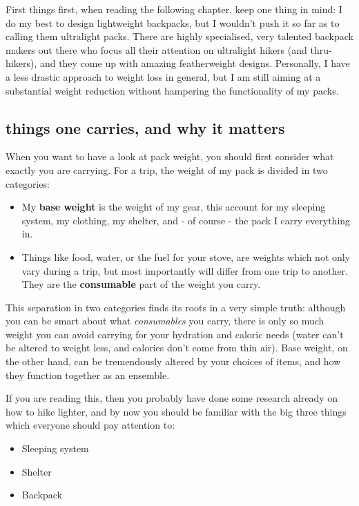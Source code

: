 First things first, when reading the following chapter, keep one thing in mind: I do my best to design lightweight backpacks, but I wouldn't push it so far as to calling them ultralight packs. There are highly specialised, very talented backpack makers out there who focus all their attention on ultralight hikers (and thru-hikers),  and they come up with amazing featherweight designs. Personally, I have a less drastic approach to weight loss in general, but I am still aiming at a substantial weight reduction without hampering the functionality of my packs.

\subsection{things one carries, and why it matters}

When you want to have a look at pack weight, you should first consider what exactly you are carrying. For a trip, the weight of my pack is divided in two categories:

\begin{itemize}
	\item My \textbf{base weight} is the weight of my gear, this account for my sleeping system, my clothing, my shelter, and - of course - the pack I carry everything in.
	\item Things like food, water, or the fuel for your stove, are weights which not only vary during a trip, but most importantly will differ from one trip to another. They are the \textbf{consumable} part of the weight you carry.
\end{itemize}

This separation in two categories finds its roots in a very simple truth: although you can be smart about what \textit{consumables} you carry, there is only so much weight you can avoid carrying  for your hydration and caloric needs (water can't be altered to weight less, and calories don't come from thin air). Base weight, on the other hand, can be tremendously altered by your choices of items, and how they function together as an ensemble.

If you are reading this, then you probably have done some research already on how to hike lighter, and by now you should be familiar with the big three things which everyone should pay attention to:

\begin{itemize}
	\item Sleeping system
	\item Shelter
	\item Backpack
\end{itemize}

